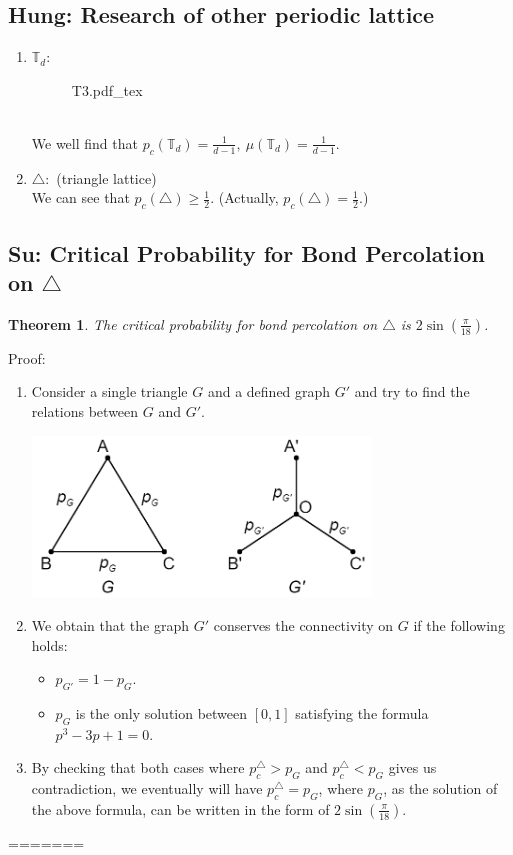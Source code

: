 \documentclass[12pt]{article}
\theoremstyle{plane}
\newtheorem*{thm}{Theorem}
\theoremstyle{definition}
\newcommand{\inccfig}[1]{%
{#1.pdf_tex}
}
\begin{document}
\subsection*{Hung: Research of other periodic lattice}
\begin{enumerate}
    \item $\mathbb{T}_d:$
	\begin{figure}[htp]
	\centering
	\def\svgwidth{7cm}
	\inccfig{T3}
	\end{figure}\\
	We well find that $p_c(\mathbb{T}_d)=\frac{1}{d-1},\ \mu(\mathbb{T}_d)=\frac{1}{d-1}.$
	\item $\triangle:$ (triangle lattice)\\[5pt]
	We can see that $p_c(\triangle)\geq \frac{1}{2}.$ (Actually, $p_c(\triangle)=\frac{1}{2}.$)
\end{enumerate}
\subsection*{Su: Critical Probability for Bond Percolation on $\triangle$}
\begin{thm}
The critical probability for bond percolation on $\triangle$ is $2\sin (\frac{\pi}{18})$.\\
\end{thm}
Proof:
\begin{enumerate}
	\item Consider a single triangle $G$ and a defined graph $G'$ and try to find the relations between $G$ and $G'$.
	\begin{center}
		\includegraphics[width=9cm]{./picture/try_an_goal.png}
	\end{center}
	\item We obtain that the graph $G'$ conserves the connectivity on $G$ if the following holds: 
		\begin{itemize}
			\item $p_{G'} = 1 - p_{G}$.
			\item $p_{G}$ is the only solution between $[0,1]$ satisfying the formula $p^3-3p+1=0$.
		\end{itemize}
	\item By checking that both cases where $p_{c}^{\triangle} > p_{G}$ and $p_{c}^{\triangle} < p_{G}$ gives us contradiction, we eventually will have $p_{c}^{\triangle} = p_{G}$, where $p_{G}$, as the solution of the above formula, can be written in the form of $2\sin(\frac{\pi}{18})$.
\end{enumerate}
=======
\end{document}
